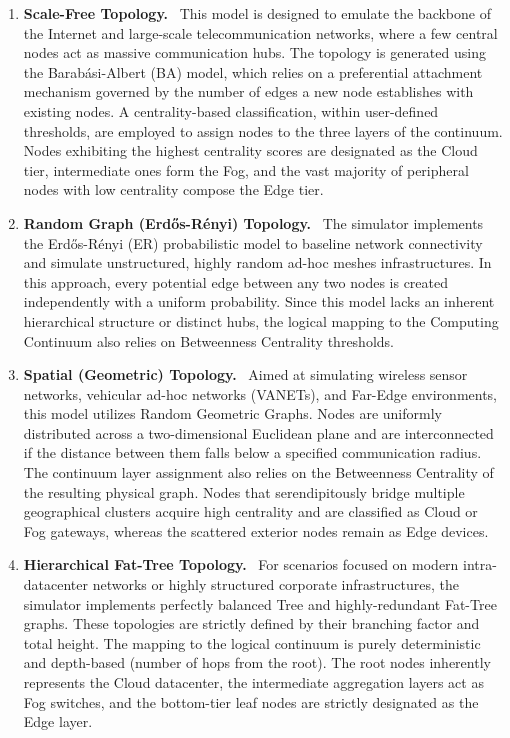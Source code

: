 \documentclass[ASNA]{USG} %
\begin{document}
\begin{enumerate}
\item \textbf{Scale-Free Topology.}~\cite{Rak2020The} This model is designed to emulate the backbone of the Internet and large-scale telecommunication networks, where a few central nodes act as massive communication hubs. The topology is generated using the Barabási-Albert (BA) model, which relies on a preferential attachment mechanism governed by the number of edges a new node establishes with existing nodes. A centrality-based classification, within user-defined thresholds, are employed to assign nodes to the three layers of the continuum. Nodes exhibiting the highest centrality scores are designated as the Cloud tier, intermediate ones form the Fog, and the vast majority of peripheral nodes with low centrality compose the Edge tier.

\item \textbf{Random Graph (Erd\H{o}s-Rényi) Topology.}~\cite{Bu2024Edge} The simulator implements the Erd\H{o}s-Rényi (ER) probabilistic model to baseline network connectivity and simulate unstructured, highly random ad-hoc meshes infrastructures. In this approach, every potential edge between any two nodes is created independently with a uniform probability. Since this model lacks an inherent hierarchical structure or distinct hubs, the logical mapping to the Computing Continuum also relies on Betweenness Centrality thresholds.

\item \textbf{Spatial (Geometric) Topology.}~\cite{Tosun2023CoRMAC} Aimed at simulating wireless sensor networks, vehicular ad-hoc networks (VANETs), and Far-Edge environments, this model utilizes Random Geometric Graphs. Nodes are uniformly distributed across a two-dimensional Euclidean plane and are interconnected if the distance between them falls below a specified communication radius. The continuum layer assignment also relies on the Betweenness Centrality of the resulting physical graph. Nodes that serendipitously bridge multiple geographical clusters acquire high centrality and are classified as Cloud or Fog gateways, whereas the scattered exterior nodes remain as Edge devices.

\item \textbf{Hierarchical Fat-Tree Topology.}~\cite{Guo2015On} For scenarios focused on modern intra-datacenter networks or highly structured corporate infrastructures, the simulator implements perfectly balanced Tree and highly-redundant Fat-Tree graphs. These topologies are strictly defined by their branching factor and total height. The mapping to the logical continuum is purely deterministic and depth-based (number of hops from the root). The root nodes inherently represents the Cloud datacenter, the intermediate aggregation layers act as Fog switches, and the bottom-tier leaf nodes are strictly designated as the Edge layer.


\end{enumerate}
\end{document}

